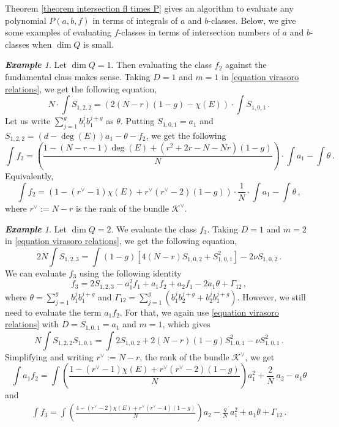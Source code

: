 \documentclass[11pt]{amsart}
\theoremstyle{remark}
\newtheorem{example}[theorem]{\bf Example}
\newcommand{\K}{\mathcal{K}}
\numberwithin{theorem}{section}
\begin{document}
Theorem \ref{theorem intersection fl times P} gives an algorithm to evaluate any polynomial 
$P(a,b,f)$ in terms of integrals of $a$ and $b$-classes. 
Below, we give some examples of evaluating $f$-classes in terms of intersection numbers of $a$ and $b$-classes
when $\dim Q$ is small.
\begin{example}
    Let $\dim Q =1$.
    Then evaluating the class $f_2$ against the fundamental class makes sense.
    Taking $D=1$ and $m=1$ in \eqref{equation virasoro relations},
    we get the following equation,
    $$ N \cdot \int S_{1,2,2} = 
    (2(N-r)(1-g) - \chi(E)) \cdot \int S_{1,0,1}\,.$$
    Let us write $\sum_{j=1}^g b_1^j b_1^{j+g}$ as $\theta$.
    Putting $S_{1,0,1}=a_1$ and 
    $S_{1,2,2}=(d-\deg(E))a_1- \theta - f_2$,
    we get the following
    $$\int f_2 = \left(\frac{1-(N-r-1)\deg(E) + (r^2+2r-N-Nr)(1-g)}{N} \right) \cdot \int a_1 - \int \theta\,.$$
    Equivalently,
    $$\int f_2 = (1-(r^\vee-1)\chi(E) + r^\vee(r^\vee-2)(1-g)) \cdot \frac{1}{N} \cdot \int a_1 - \int \theta\,,$$
    where $r^\vee := N-r$ is the rank of the bundle $\K^\vee$.
\end{example}

    \begin{example}\label{example integral in dim 2}
    Let $\dim Q =2$.
    We evaluate the class $f_3$.
    Taking $D=1$ and $m=2$ in \eqref{equation virasoro relations},
    we get the following equation,
    \begin{equation*}
        2N \int S_{1,2,3} 
        = \int (1-g)[4(N-r)S_{1,0,2}+S_{1,0,1}^2] - 2\nu S_{1,0,2}\,.
    \end{equation*}
    We can evaluate $f_3$ using the following identity
    $$f_3=2S_{1,2,3} - a_1^2f_1 +a_1f_2 + a_2f_1-2a_1 \theta + \Gamma_{12}\,,$$
    where $\theta = \sum_{j=1}^g b_1^j b_1^{j+g}$ and
    $\Gamma_{12} = \sum_{j=1}^g (b_1^j b_2^{j+g} + b_2^j b_1^{j+g})$.
    However, we still need to evaluate the term $a_1f_2$. 
    For that, we again use \eqref{equation virasoro relations} with $D=S_{1,0,1}=a_1$ and $m=1$,
    which gives
    $$ N \int S_{1,2,2} S_{1,0,1} 
    = \int 2 S_{1,0,2} + 2(N-r)(1-g)S_{1,0,1}^2 - \nu S_{1,0,1}^2\,.$$
    Simplifying and writing $r^\vee := N-r$, the rank of the bundle $\K^\vee$, we get
    \begin{equation*}
        \int a_1 f_2 = \int \left( \frac{1-(r^\vee-1)\chi(E)+r^\vee(r^\vee-2)(1-g)}{N} \right) a_1^2 + \frac{2}{N} \ a_2 -  a_1 \theta 
    \end{equation*}
    and
    \begin{align*}
        \int f_3 = \int \left( \frac{4 - (r^\vee-2)\chi(E) + r^\vee(r^\vee-4)(1-g)}{N} \right) a_2 - \frac{g}{N} \ a_1^2 + a_1 \theta + \Gamma_{12}\,.
    \end{align*}
    \end{example}
\end{document}
